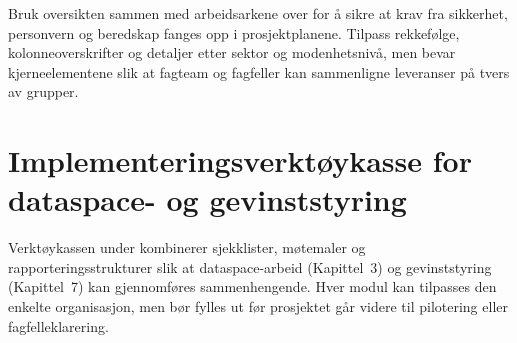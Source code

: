 Bruk oversikten sammen med arbeidsarkene over for å sikre at krav fra sikkerhet, personvern og
beredskap fanges opp i prosjektplanene. Tilpass rekkefølge, kolonneoverskrifter og detaljer etter
sektor og modenhetsnivå, men bevar kjerneelementene slik at fagteam og fagfeller kan sammenligne
leveranser på tvers av grupper.

\section{Implementeringsverktøykasse for dataspace- og gevinststyring}
Verktøykassen under kombinerer sjekklister, møtemaler og rapporteringsstrukturer slik at
dataspace-arbeid (Kapittel~3) og gevinststyring (Kapittel~7) kan gjennomføres sammenhengende.
Hver modul kan tilpasses den enkelte organisasjon, men bør fylles ut før prosjektet går videre til
pilotering eller fagfelleklarering.

